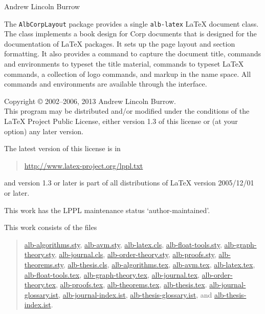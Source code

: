 \documentclass[11pt,a4paper,oneside,titlepage]{alb-latex}
\begin{document}



\begin{albTitlePage}


  Andrew Lincoln Burrow


  The \texttt{AlbCorpLayout} package provides a single \texttt{alb-latex}
  \LaTeX{} document class.  The class implements a book design for
  \albLogo{}Corp documents that is designed for the documentation of
  \LaTeX{} packages.  It sets up the page layout and section formatting.
  It also provides a command to capture the document title, commands and
  environments to typeset the title material, commands to typeset
  \LaTeX{} commands, a collection of logo commands, and markup in the
  \albLogo{} name space.  All commands and environments are available
  through the \AUCTeX{} interface.



  Copyright \copyright{} 2002--2006, 2013 Andrew Lincoln Burrow.\\
  This program may be distributed and/or modified under the conditions
  of the \LaTeX{} Project Public License, either version 1.3 of this
  license or (at your option) any later version.

  \medskip{}

  The latest version of this license is in
  \begin{quote}
    \url{http://www.latex-project.org/lppl.txt}
  \end{quote}
  and version 1.3 or later is part of all distributions of LaTeX version
  2005/12/01 or later.

  \medskip{}

  This work has the LPPL maintenance status `author-maintained'.

  \medskip{}

  This work consists of the files
  \begin{quote}
    \begin{flushleft}
      \url{alb-algorithms.sty}, \url{alb-avm.sty}, \url{alb-latex.cls},
      \url{alb-float-tools.sty}, \url{alb-graph-theory.sty},
      \url{alb-journal.cls}, \url{alb-order-theory.sty},
      \url{alb-proofs.sty}, \url{alb-theorems.sty},
      \url{alb-thesis.cls}, \url{alb-algorithms.tex}, \url{alb-avm.tex},
      \url{alb-latex.tex}, \url{alb-float-tools.tex},
      \url{alb-graph-theory.tex}, \url{alb-journal.tex},
      \url{alb-order-theory.tex}, \url{alb-proofs.tex},
      \url{alb-theorems.tex}, \url{alb-thesis.tex}.
      \url{alb-journal-glossary.ist}, \url{alb-journal-index.ist},
      \url{alb-thesis-glossary.ist}, and \url{alb-thesis-index.ist}.
    \end{flushleft}
  \end{quote}



\end{albTitlePage}
\end{document}
